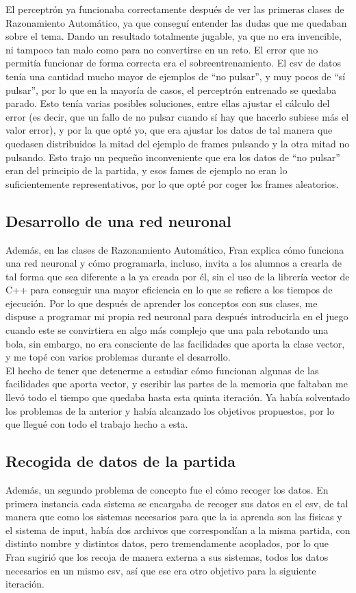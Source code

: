 El perceptrón ya funcionaba correctamente después de ver las primeras clases de Razonamiento Automático, ya que conseguí entender las dudas que me quedaban sobre el tema. Dando un resultado totalmente jugable, ya que no era invencible, ni tampoco tan malo como para no convertirse en un reto. El error que no permitía funcionar de forma correcta era el sobreentrenamiento. El \gls{csv} de datos tenía una cantidad mucho mayor de ejemplos de ``no pulsar'', y muy pocos de ``sí pulsar'', por lo que en la mayoría de casos, el perceptrón entrenado se quedaba parado. Esto tenía varias posibles soluciones, entre ellas ajustar el cálculo del error (es decir, que un fallo de no pulsar cuando sí hay que hacerlo subiese más el valor error), y por la que opté yo, que era ajustar los datos de tal manera que quedasen distribuidos la mitad del ejemplo de frames pulsando y la otra mitad no pulsando. Esto trajo un pequeño inconveniente que era los datos de ``no pulsar'' eran del principio de la partida, y esos fames de ejemplo no eran lo suficientemente representativos, por lo que opté por coger los frames aleatorios.

\subsection{Desarrollo de una red neuronal}
Además, en las clases de Razonamiento Automático, Fran explica cómo funciona una red neuronal y cómo programarla, incluso, invita a los alumnos a crearla de tal forma que sea diferente a la ya creada por él, sin el uso de la librería vector de C++ para conseguir una mayor eficiencia en lo que se refiere a los tiempos de ejecución. Por lo que después de aprender los conceptos con sus clases, me dispuse a programar mi propia red neuronal para después introducirla en el juego cuando este se convirtiera en algo más complejo que una pala rebotando una bola, sin embargo, no era consciente de las facilidades que aporta la clase vector, y me topé con varios problemas durante el desarrollo.
\\
El hecho de tener que detenerme a estudiar cómo funcionan algunas de las facilidades que aporta vector, y escribir las partes de la memoria que faltaban me llevó todo el tiempo que quedaba hasta esta quinta iteración. Ya había solventado los problemas de la anterior y había alcanzado los objetivos propuestos, por lo que llegué con todo el trabajo hecho a esta.

\subsection{Recogida de datos de la partida}
Además, un segundo problema de concepto fue el cómo recoger los datos. En primera instancia cada sistema se encargaba de recoger sus datos en el \gls{csv}, de tal manera que como los sistemas necesarios para que la \gls{ia} aprenda son las físicas y el sistema de input, había dos archivos que correspondían a la misma partida, con distinto nombre y distintos datos, pero tremendamente acoplados, por lo que Fran sugirió que los recoja de manera externa a sus sistemas, todos los datos necesarios en un mismo \gls{csv}, así que ese era otro objetivo para la siguiente iteración. 

